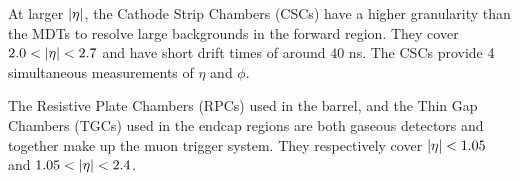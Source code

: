 At larger $\abs{\eta}$, the Cathode Strip Chambers (CSCs) have a higher granularity than the MDTs to resolve large backgrounds in the forward region. 
They cover $2.0< \abs{\eta} < 2.7$ and have short drift times of around $40$ ns. 
The CSCs provide 4 simultaneous measurements of $\eta$ and $\phi$.

The Resistive Plate Chambers (RPCs) used in the barrel, and the Thin Gap Chambers (TGCs) used in the endcap regions are both gaseous detectors and together make up the muon trigger system. 
They respectively cover $\abs{\eta} < 1.05$ and $1.05 < \abs{\eta} < 2.4$.



